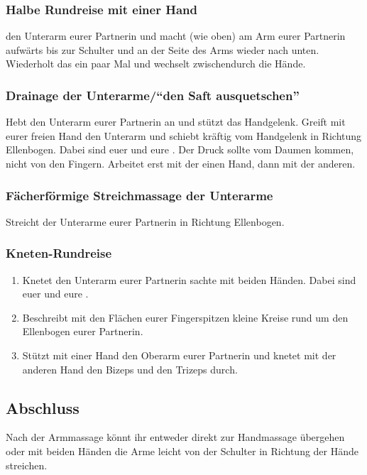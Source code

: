 \subsubsection{Halbe Rundreise mit einer Hand}
 den Unterarm eurer Partnerin und macht  (wie oben) am Arm eurer Partnerin aufwärts bis zur Schulter und an der Seite des Arms wieder nach unten. Wiederholt das ein paar Mal und wechselt zwischendurch die Hände.

\subsubsection{Drainage der Unterarme/"`den Saft ausquetschen"'}
Hebt den Unterarm eurer Partnerin an und stützt das Handgelenk. Greift mit eurer freien Hand den Unterarm und schiebt kräftig vom Handgelenk in Richtung Ellenbogen. Dabei sind euer  und eure . Der Druck sollte vom Daumen kommen, nicht von den Fingern. Arbeitet erst mit der einen Hand, dann mit der anderen.

\subsubsection{Fächerförmige Streichmassage der Unterarme}
Streicht  der Unterarme eurer Partnerin in Richtung Ellenbogen.

\subsubsection{Kneten-Rundreise}
\begin{oframed}
  \begin{enumerate}
    \item {} Knetet den Unterarm eurer Partnerin sachte mit beiden Händen. Dabei sind euer  und eure .
    \item {} Beschreibt mit den Flächen eurer Fingerspitzen kleine Kreise rund um den Ellenbogen eurer Partnerin.
    \item {} Stützt mit einer Hand den Oberarm eurer Partnerin und knetet mit der anderen Hand den Bizeps und den Trizeps durch.
  \end{enumerate}
\end{oframed}

\subsection{Abschluss}
Nach der Armmassage könnt ihr entweder direkt zur Handmassage übergehen oder mit beiden Händen die Arme leicht von der Schulter in Richtung der Hände streichen.
\pagebreak
